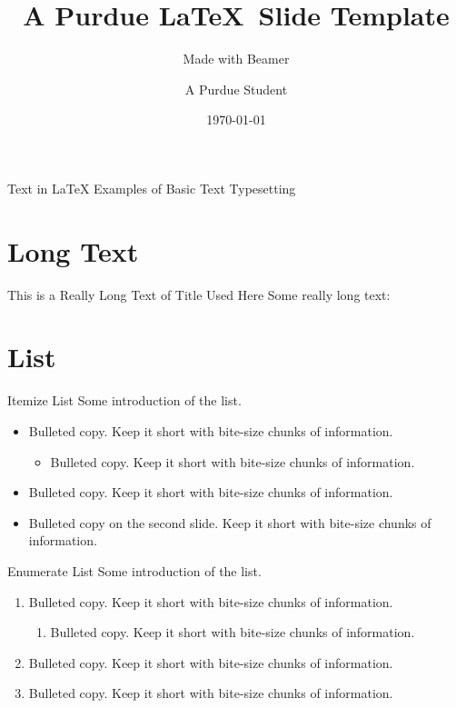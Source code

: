 \documentclass{purdue-slide}
\title{A Purdue \LaTeX\ Slide Template}
\subtitle{Made with Beamer}
\author{A Purdue Student}
\institute{Purdue University}
\date{\today}
\begin{document}
\begin{titleframe}{}
    \maketitle
\end{titleframe}

\begin{titleframe}{Text in \LaTeX}
    Examples of Basic Text Typesetting
\end{titleframe}

\section{Long Text}

\begin{frame}{This is a Really Long Text of Title Used Here}
    Some really long text:
    
    \bigskip
    
    \lipsum[2]
\end{frame}

\section{List}

\begin{frame}{Itemize List}
    Some introduction of the list.
    \begin{itemize}
        \item Bulleted copy. Keep it short with bite-size chunks of information.
        \begin{itemize}
            \item Bulleted copy. Keep it short with bite-size chunks of information.
        \end{itemize}
        \item Bulleted copy. Keep it short with bite-size chunks of information.
        \pause\item Bulleted copy on the second slide. Keep it short with bite-size chunks of information.
    \end{itemize}
\end{frame}

\begin{frame}{Enumerate List}
    Some introduction of the list.
    \begin{enumerate}
        \item Bulleted copy. Keep it short with bite-size chunks of information.
        \begin{enumerate}
            \item Bulleted copy. Keep it short with bite-size chunks of information.
        \end{enumerate}
        \item Bulleted copy. Keep it short with bite-size chunks of information.
        \item Bulleted copy. Keep it short with bite-size chunks of information.
    \end{enumerate}
\end{frame}
\end{document}
